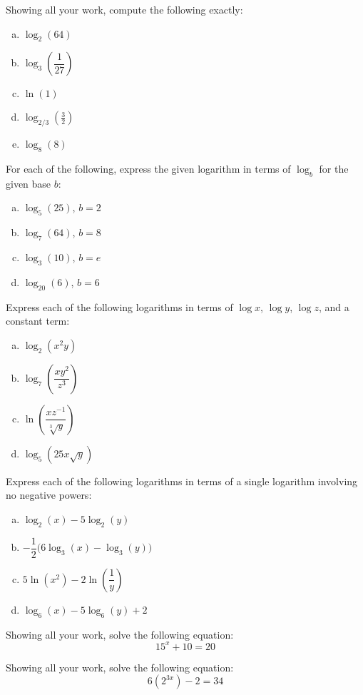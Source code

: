 \documentclass[11pt,letterpaper]{article}
\begin{document}
\newpage



 Showing all your work, compute the following exactly:
	\begin{enumerate}[(a)]
	\item $\log_2(64)$
	\item $\log_3 \left( \dfrac{1}{27} \right)$
	\item $\ln(1)$
	\item $\log_{2/3} \left( \frac{3}{2} \right)$
	\item $\log_8(8)$
	\end{enumerate}



\newpage



 For each of the following, express the given logarithm in terms of $\log_b$ for the given base $b$:
	\begin{enumerate}[(a)]
	\item $\log_5(25)$, $b= 2$
	\item $\log_7(64)$, $b= 8$
	\item $\log_3(10)$, $b= e$
	\item $\log_{20}(6)$, $b= 6$
	\end{enumerate}



\newpage



 Express each of the following logarithms in terms of $\log x$, $\log y$, $\log z$, and a constant term:
	\begin{enumerate}[(a)]
	\item $\log_2(x^2y)$
	\item $\log_7 \left(\dfrac{x y^2}{z^3} \right)$
	\item $\ln \left( \dfrac{x z^{-1}}{\sqrt[3]{y}} \right)$
	\item $\log_5(25 x \sqrt{y})$
	\end{enumerate}



\newpage



 Express each of the following logarithms in terms of a single logarithm involving no negative powers:
	\begin{enumerate}[(a)]
	\item $\log_2(x) - 5 \log_2(y)$
	\item $-\dfrac{1}{2} \big( 6 \log_3(x) - \log_3(y) \big)$
	\item $5\ln(x^2) - 2 \ln \left( \dfrac{1}{y} \right)$
	\item $\log_6(x) - 5 \log_6(y) + 2$
	\end{enumerate}



\newpage



 Showing all your work, solve the following equation: 
	\[
	15^x + 10= 20
	\]



\newpage



 Showing all your work, solve the following equation: 
	\[
	6(2^{3x}) - 2= 34
	\]
\end{document}
